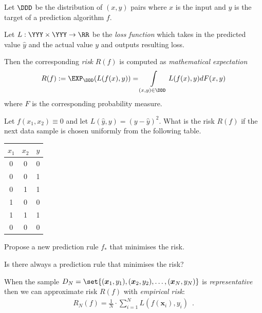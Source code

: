 \documentclass[landscape,footrule]{foils}
\renewcommand{\vec}[1]{\boldsymbol{#1}}
\begin{document}
 

Let $\DDD$ be the distribution of $(x,y)$ pairs where $x$ is the input and $y$ is the target of a prediction algorithm $f$. 
\bigskip

Let $L:\YYY\times\YYY\to\RR$ be the \emph{loss function} which takes in the predicted value $\hat{y}$ and the actual value $y$ and outputs resulting loss.
\bigskip

Then the corresponding \emph{risk} $R(f)$ is computed as \emph{mathematical expectation}
\begin{align*}
 R(f):=\EXP_\DDD(L(f(x), y))=\int\limits_{(x,y)\in\DDD} L(f(x), y) dF(x,y)
\end{align*}   
where $F$ is the corresponding probability measure.


\begin{triangles}
\item Let $f(x_1,x_2)\equiv 0$ and let $L(\hat{y}, y)= (y-\hat{y})^2$. What is the risk $R(f)$ if the next data sample is chosen uniformly from the following table.
\bigskip

\begin{center}
\begin{tabular}{|c|c|c|}
\hline
$x_1$ & $x_2$ & $y$\\ 
\hline
0 & 0 & 0\\
0 & 0 & 1\\
0 & 1 & 1\\
1 & 0 & 0\\
1 & 1 & 1\\
0 & 0 & 0\\
\hline
\end{tabular}
\bigskip

\end{center}
\item Propose a new prediction rule $f_*$ that minimises the risk. 
\item Is there always a prediction rule that minimises the risk?
\end{triangles}


When the sample $D_N=\set{(\vec{x}_1,y_1),(\vec{x}_2,y_2),\ldots, (\vec{x}_N, y_N)}$ is \emph{representative} then we can approximate risk $R(f)$ with \emph{empirical risk}:
\begin{align*}
  R_N(f)=\frac{1}{N}\cdot\sum_{i=1}^N L(f(\vec{x}_i), y_i)\enspace.
\end{align*} 
\hspace*{1cm}
\end{document}
